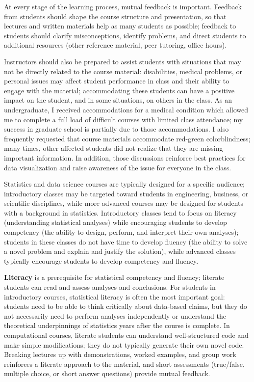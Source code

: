 \documentclass[12pt, letterpaper, sans]{moderncv}
\begin{document}
\vspace{.5cm}\hspace{8pt}
At every stage of the learning process, mutual feedback is important. Feedback from students should shape the course structure and presentation, so that lectures and written materials help as many students as possible; feedback to students should clarify misconceptions, identify problems, and direct students to additional resources (other reference material, peer tutoring, office hours).

Instructors should also be prepared to assist students with situations that may not be directly related to the course material: disabilities, medical problems, or personal issues may affect student performance in class and their ability to engage with the material; accommodating these students can have a positive impact on the student, and in some situations, on others in the class. As an undergraduate, I received accommodations for a medical condition which allowed me to complete a full load of difficult courses with limited class attendance; my success in graduate school is partially due to those accommodations. I also frequently requested that course materials accommodate red-green colorblindness; many times, other affected students did not realize that they are missing important information. In addition, those discussions reinforce best practices for data visualization and raise awareness of the issue for everyone in the class.

\vspace{.5cm}\hspace{8pt}
Statistics and data science courses are typically designed for a specific audience; introductory classes may be targeted toward students in engineering, business, or scientific disciplines, while more advanced courses may be designed for students with a background in statistics. Introductory classes tend to focus on literacy (understanding statistical analyses) while encouraging students to develop competency (the ability to design, perform, and interpret their own analyses); students in these classes do not have time to develop fluency (the ability to solve a novel problem and explain and justify the solution), while advanced classes typically encourage students to develop competency and fluency.

\textbf{Literacy} is a prerequisite for statistical competency and fluency; literate students can read and assess analyses and conclusions. For students in introductory courses, statistical literacy is often the most important goal: students need to be able to think critically about data-based claims, but they do not necessarily need to perform analyses independently or understand the theoretical underpinnings of statistics years after the course is complete. In computational courses, literate students can understand well-structured code and make simple modifications; they do not typically generate their own novel code. Breaking lectures up with demonstrations, worked examples, and group work reinforces a literate approach to the material, and short assessments (true/false, multiple choice, or short answer questions) provide mutual feedback.
\end{document}
